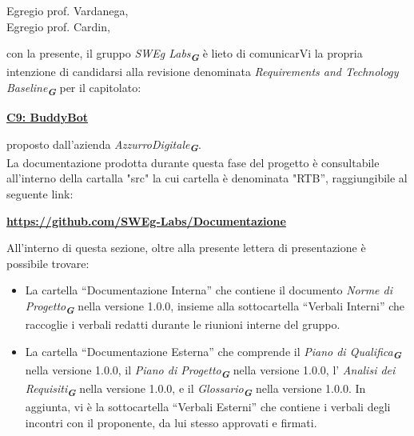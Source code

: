 
\fancyfoot[C]{\thepage}                %



Egregio prof. Vardanega, \\
Egregio prof. Cardin, \\
\vspace{0.5cm}

con la presente, il gruppo \emph{SWEg Labs}\textsubscript{\textit{\textbf{G}}} è lieto di comunicarVi la propria intenzione di candidarsi alla revisione denominata \emph{Requirements and Technology Baseline}\textsubscript{\textit{\textbf{G}}} per il capitolato:\\
\begin{center}
\href{https://www.math.unipd.it/~tullio/IS-1/2024/Progetto/C9.pdf}{\textbf{C9: BuddyBot}}
\end{center}
proposto dall’azienda \emph{AzzurroDigitale}\textsubscript{\textit{\textbf{G}}}.\\
La documentazione prodotta durante questa fase del progetto è consultabile all’interno della cartalla "src"
la cui cartella è denominata "RTB”, raggiungibile al seguente link: 
\begin{center}
\textbf{\href{https://github.com/SWEg-Labs/Documentazione}{https://github.com/SWEg-Labs/Documentazione}}
\end{center}
All’interno di questa sezione, oltre alla presente lettera di presentazione è possibile trovare:
\begin{itemize}
\item La cartella “Documentazione Interna” che contiene il documento \emph{Norme di Progetto}\textsubscript{\textit{\textbf{G}}} nella versione 1.0.0, insieme alla sottocartella “Verbali Interni” che raccoglie i verbali redatti durante le riunioni interne del gruppo.
\item La cartella “Documentazione Esterna” che comprende il \emph{Piano di Qualifica}\textsubscript{\textit{\textbf{G}}} nella versione 1.0.0, il \emph{Piano di Progetto}\textsubscript{\textit{\textbf{G}}} nella versione 1.0.0, l' \emph{Analisi dei Requisiti}\textsubscript{\textit{\textbf{G}}} nella versione 1.0.0, e il \emph{Glossario}\textsubscript{\textit{\textbf{G}}} nella versione 1.0.0. In aggiunta, vi è la sottocartella “Verbali Esterni” che contiene i verbali degli incontri con il proponente, da lui stesso approvati e firmati.
\end{itemize}
